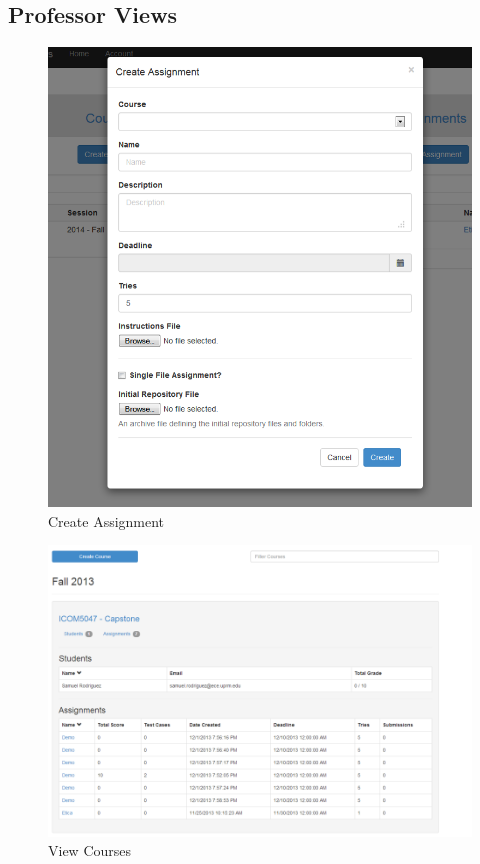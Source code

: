 \subsection{Professor Views}

\begin{figure}[H]
	\centering
	\includegraphics[width=\textwidth]{img/createassign-screen}
	\caption{Create Assignment}
\end{figure}

\begin{figure}[H]
	\centering
	\includegraphics[width=\textwidth]{img/course-prof-screen}
	\caption{View Courses}
\end{figure}

